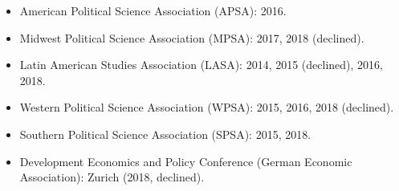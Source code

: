 \begin{itemize}
\item American Political Science Association (APSA): 2016.
\item Midwest Political Science Association (MPSA): 2017, 2018 (declined).
\item Latin American Studies Association (LASA): 2014, 2015 (declined), 2016, 2018.
\item Western Political Science Association (WPSA): 2015, 2016, 2018 (declined).
\item Southern Political Science Association (SPSA): 2015, 2018.
\item Development Economics and Policy Conference (German Economic Association): Zurich (2018, declined).
\end{itemize}
